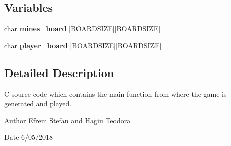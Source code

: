 \subsection*{Variables}
\begin{DoxyCompactItemize}
\item 
\mbox{\label{minesweeper__game_8c_afea4b09e1fc95fb16bc03e47b3eb8d7d}} 
char {\bfseries mines\+\_\+board} [B\+O\+A\+R\+D\+S\+I\+ZE][B\+O\+A\+R\+D\+S\+I\+ZE]
\item 
\mbox{\label{minesweeper__game_8c_abd806da59229d7e16b4335d901af9810}} 
char {\bfseries player\+\_\+board} [B\+O\+A\+R\+D\+S\+I\+ZE][B\+O\+A\+R\+D\+S\+I\+ZE]
\end{DoxyCompactItemize}


\subsection{Detailed Description}
C source code which contains the main function from where the game is generated and played. 

\begin{DoxyAuthor}{Author}
Efrem Stefan and Hagiu Teodora 
\end{DoxyAuthor}
\begin{DoxyDate}{Date}
6/05/2018 
\end{DoxyDate}
